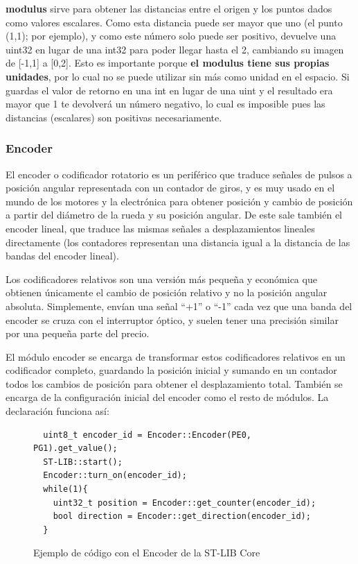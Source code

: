 \documentclass{report}
\begin{document}
\textbf{modulus} sirve para obtener las distancias entre el origen y los puntos dados como valores escalares. Como esta distancia puede ser mayor que uno (el punto (1,1); por ejemplo), y como este número solo puede ser positivo, devuelve una uint32 en lugar de una int32 para poder llegar hasta el 2, cambiando su imagen de [-1,1] a [0,2]. Esto es importante porque \textbf{el modulus tiene sus propias unidades}, por lo cual no se puede utilizar sin más como unidad en el espacio. Si guardas el valor de retorno en una int en lugar de una uint y el resultado era mayor que 1 te devolverá un número negativo, lo cual es imposible pues las distancias (escalares) son positivas necesariamente. 

\subsubsection{Encoder}
El encoder o codificador rotatorio es un periférico que traduce señales de pulsos a posición angular representada con un contador de giros, y es muy usado en el mundo de los motores y la electrónica para obtener posición y cambio de posición a partir del diámetro de la rueda y su posición angular. De este sale también el encoder lineal, que traduce las mismas señales a desplazamientos lineales directamente (los contadores representan una distancia igual a la distancia de las bandas del encoder lineal). \par
Los codificadores relativos son una versión más pequeña y económica que obtienen únicamente el cambio de posición relativo y no la posición angular absoluta. Simplemente, envían una señal ``+1'' o ``-1'' cada vez que una banda del encoder se cruza con el interruptor óptico, y suelen tener una precisión similar por una pequeña parte del precio. \par \vspace{0.3cm}
El módulo encoder se encarga de transformar estos codificadores relativos en un codificador completo, guardando la posición inicial y sumando en un contador todos los cambios de posición para obtener el desplazamiento total. También se encarga de la configuración inicial del encoder como el resto de módulos. La declaración funciona así:
\begin{figure}[h]
\begin{lstlisting}
  uint8_t encoder_id = Encoder::Encoder(PE0, PG1).get_value();
  ST-LIB::start();
  Encoder::turn_on(encoder_id);
  while(1){
    uint32_t position = Encoder::get_counter(encoder_id);
    bool direction = Encoder::get_direction(encoder_id);
  }
\end{lstlisting}
\caption{Ejemplo de código con el Encoder de la ST-LIB Core}
  \label{Encodercode}
\end{figure}
\end{document}
